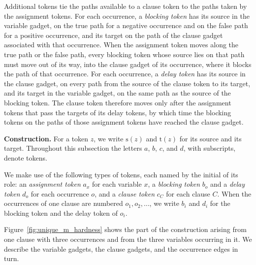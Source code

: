 \documentclass[a4paper,USenglish,thm-restate]{lipics-v2021}
\newcommand{\src}{\mathrm{s}}
\newcommand{\tgt}{\mathrm{t}}
\theoremstyle{problemstyle}
\begin{document}
Additional tokens tie the paths available to a clause token to the paths
taken by the assignment tokens. For each occurrence, a \emph{blocking
token} has its source in the variable gadget, on the true path for a
negative occurrence and on the false path for a positive occurrence, and
its target on the path of the clause gadget associated with that
occurrence. When the assignment token moves along the true path or the
false path, every blocking token whose source lies on that path must move
out of its way, into the clause gadget of its occurrence, where it blocks
the path of that occurrence. For each occurrence, a \emph{delay token} has
its source in the clause gadget, on every path from the source of the
clause token to its target, and its target in the variable gadget, on the
same path as the source of the blocking token. The clause token therefore
moves only after the assignment tokens that pass the targets of its delay
tokens, by which time the blocking tokens on the paths of those
assignment tokens have reached the clause gadget.

\smallskip
\noindent\textbf{Construction.}
For a token $z$, we write $\src(z)$ and $\tgt(z)$ for its source and its
target. Throughout this subsection the letters $a$, $b$, $c$, and $d$, with
subscripts, denote tokens.

We make use of the following types of tokens, each named by the initial of
its role: an \emph{assignment token} $a_x$ for each variable $x$, a
\emph{blocking token} $b_o$ and a \emph{delay token} $d_o$ for each
occurrence $o$, and a \emph{clause token} $c_C$ for each clause $C$. When
the occurrences of one clause are numbered $o_1,o_2,\ldots$, we write $b_i$
and $d_i$ for the blocking token and the delay token of $o_i$.

Figure~\ref{fig:unique_m_hardness} shows the part of the construction arising
from one clause with three occurrences and from the three variables occurring in it. We describe the variable gadgets, the clause gadgets, and the occurrence edges in turn.
\end{document}
